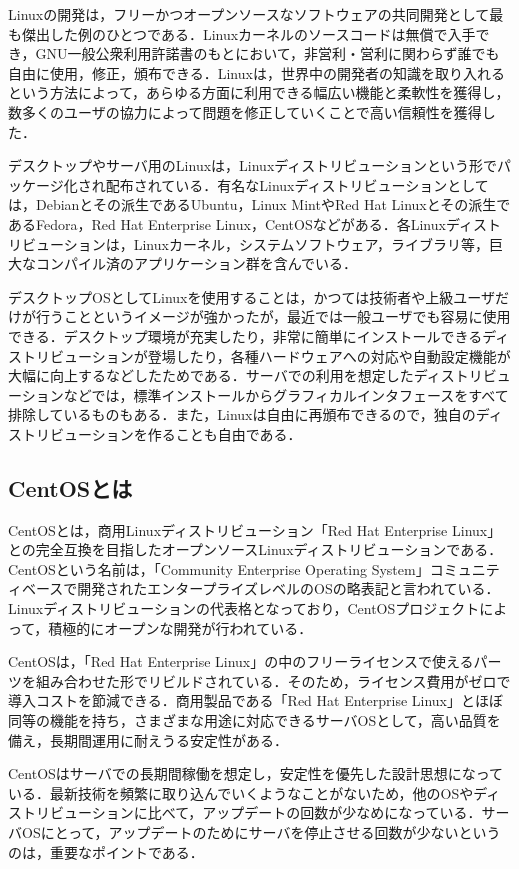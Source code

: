 Linuxの開発は，フリーかつオープンソースなソフトウェアの共同開発として最も傑出した例のひとつである．Linuxカーネルのソースコードは無償で入手でき，GNU一般公衆利用許諾書のもとにおいて，非営利・営利に関わらず誰でも自由に使用，修正，頒布できる．Linuxは，世界中の開発者の知識を取り入れるという方法によって，あらゆる方面に利用できる幅広い機能と柔軟性を獲得し，数多くのユーザの協力によって問題を修正していくことで高い信頼性を獲得した．

デスクトップやサーバ用のLinuxは，Linuxディストリビューションという形でパッケージ化され配布されている．有名なLinuxディストリビューションとしては，Debianとその派生であるUbuntu，Linux MintやRed Hat Linuxとその派生であるFedora，Red Hat Enterprise Linux，CentOSなどがある．各Linuxディストリビューションは，Linuxカーネル，システムソフトウェア，ライブラリ等，巨大なコンパイル済のアプリケーション群を含んでいる．

デスクトップOSとしてLinuxを使用することは，かつては技術者や上級ユーザだけが行うことというイメージが強かったが，最近では一般ユーザでも容易に使用できる．デスクトップ環境が充実したり，非常に簡単にインストールできるディストリビューションが登場したり，各種ハードウェアへの対応や自動設定機能が大幅に向上するなどしたためである．サーバでの利用を想定したディストリビューションなどでは，標準インストールからグラフィカルインタフェースをすべて排除しているものもある．また，Linuxは自由に再頒布できるので，独自のディストリビューションを作ることも自由である\cite{linux}．

\newpage

\subsection{CentOSとは}
CentOSとは，商用Linuxディストリビューション「Red Hat Enterprise Linux」との完全互換を目指したオープンソースLinuxディストリビューションである．CentOSという名前は，「Community Enterprise Operating System」コミュニティベースで開発されたエンタープライズレベルのOSの略表記と言われている．Linuxディストリビューションの代表格となっており，CentOSプロジェクトによって，積極的にオープンな開発が行われている．

CentOSは，「Red Hat Enterprise Linux」の中のフリーライセンスで使えるパーツを組み合わせた形でリビルドされている．そのため，ライセンス費用がゼロで導入コストを節減できる．商用製品である「Red Hat Enterprise Linux」とほぼ同等の機能を持ち，さまざまな用途に対応できるサーバOSとして，高い品質を備え，長期間運用に耐えうる安定性がある．

CentOSはサーバでの長期間稼働を想定し，安定性を優先した設計思想になっている．最新技術を頻繁に取り込んでいくようなことがないため，他のOSやディストリビューションに比べて，アップデートの回数が少なめになっている．サーバOSにとって，アップデートのためにサーバを停止させる回数が少ないというのは，重要なポイントである．

